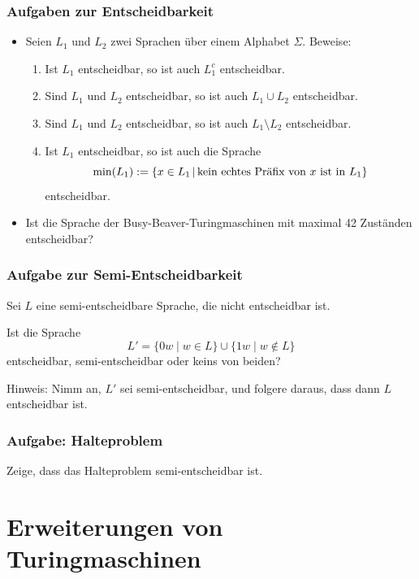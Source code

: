 \begin{frame}
\frametitle{Aufgaben zur Entscheidbarkeit}
\begin{itemize}
\item Seien $L_1$ und $L_2$ zwei Sprachen über einem Alphabet $\Sigma$.
Beweise:
\begin{enumerate}
\item Ist $L_1$ entscheidbar, so ist auch $L_1^c$ entscheidbar.
\item Sind $L_1$ und $L_2$ entscheidbar, so ist auch $L_1\cup L_2$ entscheidbar.
\item Sind $L_1$ und $L_2$ entscheidbar, so ist auch $L_1\setminus L_2$ entscheidbar.
\item Ist $L_1$ entscheidbar, so ist auch die Sprache 
$$\min(L_1):=\left\lbrace x\in L_1 \,\middle\vert\, \text{kein echtes Präfix von $x$ ist in }L_1 \right\rbrace$$
entscheidbar.
\end{enumerate}
\item Ist die Sprache der Busy-Beaver-Turingmaschinen mit maximal 42 Zuständen entscheidbar?
\end{itemize}
\end{frame}

\begin{frame}
 \frametitle{Aufgabe zur Semi-Entscheidbarkeit}
Sei $L$ eine semi-entscheidbare Sprache, die nicht entscheidbar ist.

Ist die
Sprache $$L'=\{0w \mid w \in L\} \cup \{1w \mid w \not\in L\}$$ entscheidbar,
semi-entscheidbar oder keins von beiden?

\ducttape{1cm}

Hinweis: Nimm an, $L'$ sei semi-entscheidbar, und folgere daraus, dass
dann $L$ entscheidbar ist. 
\end{frame}

\begin{frame}
 \frametitle{Aufgabe: Halteproblem}
 Zeige, dass das Halteproblem semi-entscheidbar ist.
\end{frame}

\section{Erweiterungen von Turingmaschinen}

